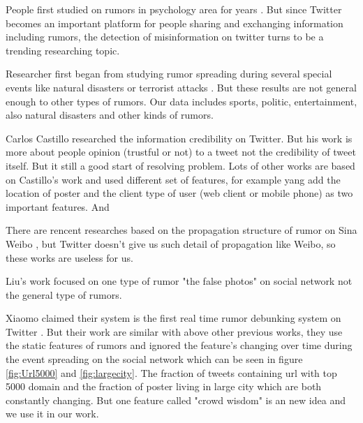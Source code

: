 People first studied on rumors in psychology area for years \cite{allport1947psychology} \cite{sunstein2014rumors}.
But since Twitter becomes an important platform for people sharing and exchanging information including rumors, the detection of misinformation on twitter turns to be a trending researching topic. 

Researcher first began from studying rumor spreading during several special events like natural disasters\cite{oh2010exploration} \cite{tanaka2012transmission}\cite{mendoza2010twitter}  or terrorist attacks \cite{starbird2014rumors}. But these results are not general enough to other types of rumors. Our data includes sports, politic, entertainment, also natural disasters and other kinds of rumors. 

Carlos Castillo researched the information credibility on Twitter\cite{castillo2011information}\cite{gupta2014tweetcred}. But his work is more about people opinion (trustful or not) to a tweet not the credibility of tweet itself. But it still a good start of resolving problem. Lots of other works are based on Castillo's work \cite{yang2012automatic} \cite{liu2015real} and used different set of features, for example yang \cite{yang2012automatic} add the location of poster and the client type of user (web client or mobile phone) as two important features.
And 



There are rencent researches based on the propagation structure of rumor on Sina Weibo\cite{wu2015false}  \cite{bao2013new}, but Twitter doesn't give us such detail of propagation like Weibo, so these works are useless for us. 

Liu's work \cite{wu2015false} focused on one type of rumor "the false photos" on social network not the general type of rumors.  

Xiaomo claimed their system is the first real time rumor debunking system on Twitter \cite{liu2015real}. But their work are similar with above other previous works, they use the static features of rumors and ignored the feature's changing over time during the event spreading on the social network which can be seen in figure \ref{fig:Url5000} and \ref{fig:largecity}. The fraction of tweets containing url with top 5000 domain and the fraction of poster living in large city which are both constantly changing. But one feature called "crowd wisdom" is an new idea and we use it in our work.

